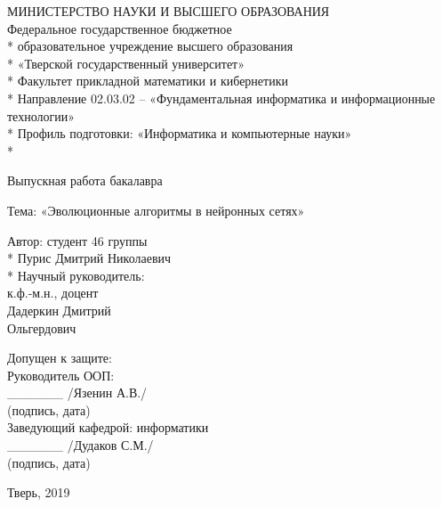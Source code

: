 \begin{titlepage} 
  \newpage 

  \begin{center} 
  МИНИСТЕРСТВО НАУКИ И ВЫСШЕГО ОБРАЗОВАНИЯ \\ 
  \vspace{1cm} 
  Федеральное государственное бюджетное \\* 
  образовательное учреждение высшего образования \\* 
  «Тверской государственный университет» \\* 
  Факультет прикладной математики и кибернетики \\* 
  Направление 02.03.02 – «Фундаментальная информатика и информационные технологии» \\* 
  Профиль подготовки: «Информатика и компьютерные науки» \\* 
  \hrulefill 
  \end{center} 
  
  
  \vspace{1em} 
  
  \begin{center} 
  \Large Выпускная работа бакалавра 
  \end{center} 
  
  \vspace{1.5em} 
  
  \begin{center} 
  Тема: «Эволюционные алгоритмы в нейронных сетях» 
  \end{center} 
  
  \vspace{6em} 
  
  \begin{flushright} 
  Автор: студент 46 группы \\* 
  Пурис Дмитрий Николаевич \\* 
  \vspace{1.5em} 
  Научный руководитель: \\ 
  к.ф.-м.н., доцент \\ 
  Дадеркин Дмитрий \\ 
  Ольгердович \\ 
  \end{flushright} 
  \begin{flushleft} 
  \vspace{1.5em} 
  Допущен к защите: \\ 
  Руководитель ООП: \\ 
  \_\_\_\_\_\_ /Язенин А.В./ \\ 
  (подпись, дата) \\ 
  Заведующий кафедрой: информатики \\ 
  \_\_\_\_\_\_ /Дудаков С.М./ \\ 
  (подпись, дата) 
  \end{flushleft} 
  
  \vspace{\fill} 
  
  \begin{center} 
  Тверь, 2019 
  \end{center} 
  
  \end{titlepage}
  \setcounter{page}{2}